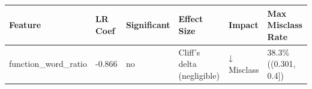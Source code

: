 \begin{tabular}{llllll}
\toprule
Feature & LR Coef & Significant & Effect Size & Impact & Max Misclass Rate \\
\midrule
function\_word\_ratio & -0.866 & no & Cliff's delta (negligible) & ↓ Misclass & 38.3\% ((0.301, 0.4]) \\
\bottomrule
\end{tabular}
